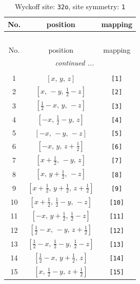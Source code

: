 \documentclass[fleqn,8pt]{jsarticle}
\begin{document}
\renewcommand{\arraystretch}{1.2}
\begin{longtable}{ccc}
\caption{Wyckoff site: {\tt 32o}, site symmetry: {\tt 1}}
 \\
 \hline \hline
No. & position & mapping \\ \hline \endfirsthead

\multicolumn{2}{l}{\tablename\ \thetable{}} \\
 \hline \hline
No. & position & mapping \\ \hline \endhead

 \hline \hline
\multicolumn{2}{r}{\footnotesize\it continued ...} \\ \endfoot

 \hline \hline
\multicolumn{2}{r}{} \\ \endlastfoot

1 & $\left[ x,\, y,\, z \right]$ & {\tt [1]} \\ \hline
2 & $\left[ x,\, - y,\, \frac{1}{2} - z \right]$ & {\tt [2]} \\ \hline
3 & $\left[ \frac{1}{2} - x,\, y,\, - z \right]$ & {\tt [3]} \\ \hline
4 & $\left[ - x,\, \frac{1}{2} - y,\, z \right]$ & {\tt [4]} \\ \hline
5 & $\left[ - x,\, - y,\, - z \right]$ & {\tt [5]} \\ \hline
6 & $\left[ - x,\, y,\, z + \frac{1}{2} \right]$ & {\tt [6]} \\ \hline
7 & $\left[ x + \frac{1}{2},\, - y,\, z \right]$ & {\tt [7]} \\ \hline
8 & $\left[ x,\, y + \frac{1}{2},\, - z \right]$ & {\tt [8]} \\ \hline
9 & $\left[ x + \frac{1}{2},\, y + \frac{1}{2},\, z + \frac{1}{2} \right]$ & {\tt [9]} \\ \hline
10 & $\left[ x + \frac{1}{2},\, \frac{1}{2} - y,\, - z \right]$ & {\tt [10]} \\ \hline
11 & $\left[ - x,\, y + \frac{1}{2},\, \frac{1}{2} - z \right]$ & {\tt [11]} \\ \hline
12 & $\left[ \frac{1}{2} - x,\, - y,\, z + \frac{1}{2} \right]$ & {\tt [12]} \\ \hline
13 & $\left[ \frac{1}{2} - x,\, \frac{1}{2} - y,\, \frac{1}{2} - z \right]$ & {\tt [13]} \\ \hline
14 & $\left[ \frac{1}{2} - x,\, y + \frac{1}{2},\, z \right]$ & {\tt [14]} \\ \hline
15 & $\left[ x,\, \frac{1}{2} - y,\, z + \frac{1}{2} \right]$ & {\tt [15]} \\ \hline

\end{longtable}
\end{document}
